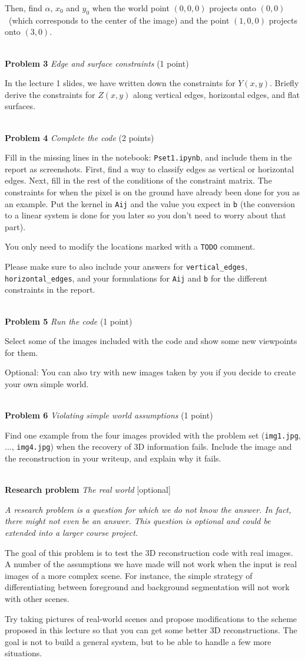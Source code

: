 \documentclass[11pt]{article}
\newcommand{\hwproblem}[2] {\noindent \\ {\bf #1} {\it #2}}
\begin{document}
Then, find $\alpha$, $x_0$ and $y_0$ when the world point $(0, 0, 0)$ projects onto  $(0, 0)$ \ (which corresponds to the center of the image) and the point $(1, 0, 0)$ projects onto $(3, 0)$.



\hwproblem{Problem 3}{Edge and surface constraints} (1 point)

In the lecture 1 slides, we have written down the constraints for $Y(x, y)$. Briefly derive the constraints for $Z(x, y)$ along vertical edges, horizontal edges, and flat surfaces.


\hwproblem{Problem 4}{Complete the code} (2 points)

Fill in the missing lines in the notebook: \texttt{Pset1.ipynb}, and include them in the report as screenshots. First, find a way to classify edges as vertical or horizontal edges. Next, fill in the rest of the conditions of the constraint matrix. The constraints for when the pixel is on the ground have already been done for you as an example. Put the kernel in \texttt{Aij} and the value you expect in \texttt{b} (the conversion to a linear system is done for you later so you don't need to worry about that part).

You only need to modify the locations marked with a \texttt{TODO} comment.

Please make sure to also include your answers for \texttt{vertical\_edges}, \texttt{horizontal\_edges}, and your formulations for \texttt{Aij} and \texttt{b} for the different constraints in the report.

\hwproblem{Problem 5}{Run the code} (1 point)

Select some of the images included with the code and show some new viewpoints for them.

Optional: You can also try with new images taken by you if you decide to create your own simple world.

\hwproblem{Problem 6}{Violating simple world assumptions} (1 point)

Find one example from the four images provided with the problem set (\texttt{img1.jpg}, ..., \texttt{img4.jpg}) when the recovery of 3D information fails. Include the image and the reconstruction in your writeup, and explain why it fails.

\hwproblem{Research problem} {The real world} [optional]

\textit{A research problem is a question for which we do not know the answer. In fact, there might not
even be an answer. This question is optional and could be extended into a larger course project.}

The goal of this problem is to test the 3D reconstruction code with real images. A number of the assumptions we have made will not work when the input is real images of a more complex scene. For instance, the simple strategy of differentiating between foreground and background segmentation will not work with other scenes.

Try taking pictures of real-world scenes and propose modifications to the scheme proposed in this lecture so that you can get some better 3D reconstructions. The goal is not to build a general system, but to be able to handle a few more situations.
\end{document}
